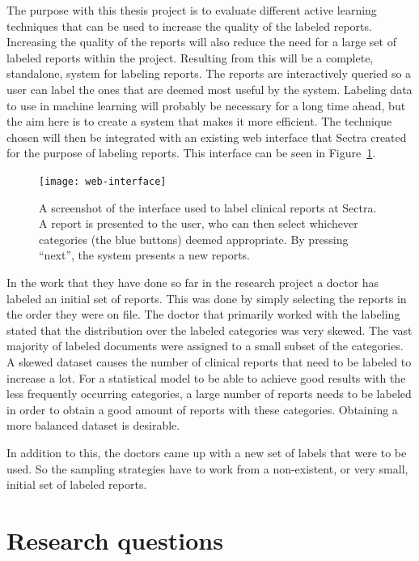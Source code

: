 The purpose with this thesis project is to evaluate different active learning techniques that can be used to increase the quality of the labeled reports.
Increasing the quality of the reports will also reduce the need for a large set of labeled reports within the project.
Resulting from this will be a complete, standalone, system for labeling reports.
The reports are interactively queried so a user can label the ones that are deemed most useful by the system.
Labeling data to use in machine learning will probably be necessary for a long time ahead, but the aim here is to create a system that makes it more efficient.
The technique chosen will then be integrated with an existing web interface that Sectra created for the purpose of labeling reports.
This interface can be seen in Figure~\ref{fig:web-interface}.

\begin{figure}
      \centering
      \texttt{[image: web-interface]}
      \caption{A screenshot of the interface used to label clinical reports at Sectra. 
               A report is presented to the user, who can then select whichever categories (the blue buttons) deemed appropriate.
               By pressing ``next'', the system presents a new reports.}
      \label{fig:web-interface}
\end{figure}

In the work that they have done so far in the research project a doctor has labeled an initial set of reports.
This was done by simply selecting the reports in the order they were on file.
The doctor that primarily worked with the labeling stated that the distribution over the labeled categories was very skewed.
The vast majority of labeled documents were assigned to a small subset of the categories.
A skewed dataset causes the number of clinical reports that need to be labeled to increase a lot.
For a statistical model to be able to achieve good results with the less frequently occurring categories, a large number of reports needs to be labeled in order to obtain a good amount of reports with these categories.
Obtaining a more balanced dataset is desirable.

In addition to this, the doctors came up with a new set of labels that were to be used.
So the sampling strategies have to work from a non-existent, or very small, initial set of labeled reports.

\section{Research questions}
\label{sec:research-questions}

